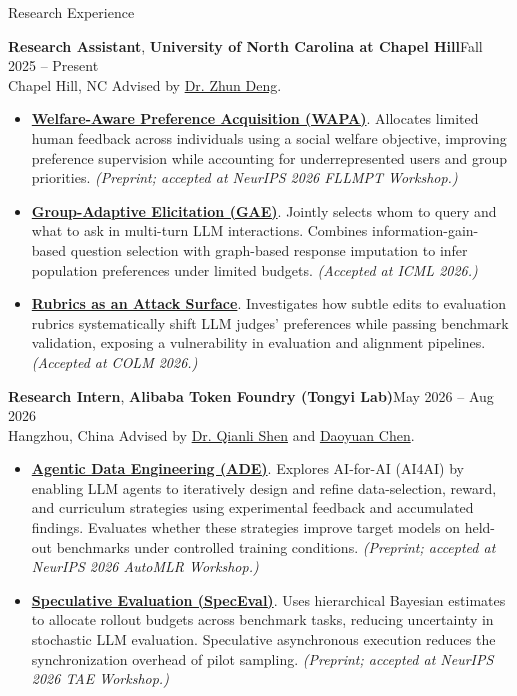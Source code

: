 \documentclass{resume}
\newcommand{\role}[4]{\par\addvspace{6pt}\Needspace{5\baselineskip}\textbf{#1}, \textbf{#2}\hfill #3\\#4\enspace\textbar\enspace}
\begin{document}
\begin{rSection}{Research Experience}
\role{Research Assistant}{University of North Carolina at Chapel Hill}{Fall 2025 -- Present}{Chapel Hill, NC}
Advised by \href{https://www.zhundeng.org/home}{Dr. Zhun Deng}.
\begin{itemize}[itemsep=1pt]
\item \textbf{\href{https://arxiv.org/pdf/2610.19035}{Welfare-Aware Preference Acquisition (WAPA)}}. Allocates limited human feedback across individuals using a social welfare objective, improving preference supervision while accounting for underrepresented users and group priorities. \textit{(Preprint; accepted at NeurIPS 2026 FLLMPT Workshop.)}
\item \textbf{\href{https://arxiv.org/pdf/2602.14279}{Group-Adaptive Elicitation (GAE)}}. Jointly selects whom to query and what to ask in multi-turn LLM interactions. Combines information-gain-based question selection with graph-based response imputation to infer population preferences under limited budgets. \textit{(Accepted at ICML 2026.)}
\item \textbf{\href{https://arxiv.org/pdf/2602.13576}{Rubrics as an Attack Surface}}. Investigates how subtle edits to evaluation rubrics systematically shift LLM judges' preferences while passing benchmark validation, exposing a vulnerability in evaluation and alignment pipelines. \textit{(Accepted at COLM 2026.)}
\end{itemize}

\role{Research Intern}{Alibaba Token Foundry (Tongyi Lab)}{May 2026 -- Aug 2026}{Hangzhou, China}
Advised by \href{https://shenqianli.github.io/}{Dr. Qianli Shen} and \href{https://yxdyc.github.io/}{Daoyuan Chen}.
\begin{itemize}[itemsep=1pt]
\item \textbf{\href{https://arxiv.org/pdf/2610.14238}{Agentic Data Engineering (ADE)}}. Explores AI-for-AI (AI4AI) by enabling LLM agents to iteratively design and refine data-selection, reward, and curriculum strategies using experimental feedback and accumulated findings. Evaluates whether these strategies improve target models on held-out benchmarks under controlled training conditions. \textit{(Preprint; accepted at NeurIPS 2026 AutoMLR Workshop.)}
\item \textbf{\href{https://arxiv.org/pdf/2609.28560}{Speculative Evaluation (SpecEval)}}. Uses hierarchical Bayesian estimates to allocate rollout budgets across benchmark tasks, reducing uncertainty in stochastic LLM evaluation. Speculative asynchronous execution reduces the synchronization overhead of pilot sampling. \textit{(Preprint; accepted at NeurIPS 2026 TAE Workshop.)}
\end{itemize}


\end{rSection}
\end{document}
